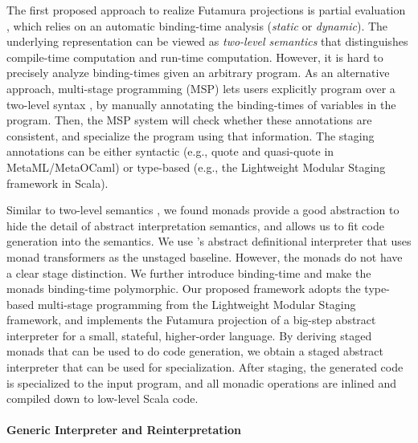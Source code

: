 The first proposed approach to realize Futamura projections is partial
evaluation \cite{DBLP:books/daglib/0072559}, which relies on an automatic
binding-time analysis (\textit{static} or \textit{dynamic}).  The underlying
representation can be viewed as \textit{two-level semantics}
\cite{NIELSON1989117, NIELSON198859} that distinguishes compile-time
computation and run-time computation.
However, it is hard to precisely analyze binding-times given an arbitrary
program. As an alternative approach, multi-stage programming (MSP)
\cite{taha1999multi, DBLP:conf/pepm/TahaS97} lets users explicitly program over
a two-level syntax \cite{Nielson:1992:TFL:130665}, by manually
annotating the binding-times of variables in the program. Then, the MSP system
will check whether these annotations are consistent, and specialize the program
using that information. The staging annotations can be either syntactic (e.g.,
quote and quasi-quote in MetaML/MetaOCaml) or type-based (e.g., the Lightweight
Modular Staging framework \cite{DBLP:conf/gpce/RompfO10} in Scala).

Similar to two-level semantics \cite{NIELSON1989117}, we found
monads provide a good abstraction to hide the detail of abstract
interpretation semantics, and allows us to fit code generation into
the semantics. We use \citet{DBLP:journals/pacmpl/DaraisLNH17}'s
abstract definitional interpreter that uses monad transformers as the
unstaged baseline. However, the monads do not have a clear stage distinction.
We further introduce binding-time and make the monads binding-time polymorphic.
Our proposed framework adopts the type-based multi-stage programming from the
Lightweight Modular Staging framework, and implements the Futamura projection
of a big-step abstract interpreter for a small, stateful, higher-order
language. By deriving staged monads that can be used to do code generation, we
obtain a staged abstract interpreter that can be used for specialization. After
staging, the generated code is specialized to the input program, and all
monadic operations are inlined and compiled down to low-level Scala code.



\paragraph{Generic Interpreter and Reinterpretation}

